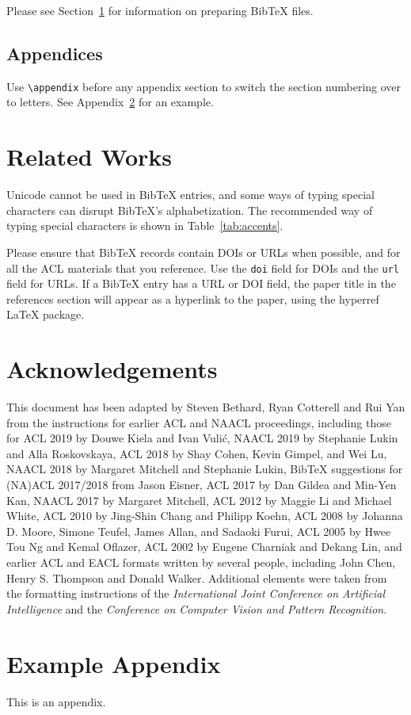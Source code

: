 \documentclass[11pt]{article}
\begin{document}
Please see Section~\ref{sec:bibtex} for information on preparing Bib\TeX{} files.

\subsection{Appendices}

Use \verb|\appendix| before any appendix section to switch the section numbering over to letters. See Appendix~\ref{sec:appendix} for an example.

\section{Related Works}
\label{sec:bibtex}

Unicode cannot be used in Bib\TeX{} entries, and some ways of typing special characters can disrupt Bib\TeX's alphabetization. The recommended way of typing special characters is shown in Table~\ref{tab:accents}.

Please ensure that Bib\TeX{} records contain DOIs or URLs when possible, and for all the ACL materials that you reference.
Use the \verb|doi| field for DOIs and the \verb|url| field for URLs.
If a Bib\TeX{} entry has a URL or DOI field, the paper title in the references section will appear as a hyperlink to the paper, using the hyperref \LaTeX{} package.

\section*{Acknowledgements}

This document has been adapted
by Steven Bethard, Ryan Cotterell and Rui Yan
from the instructions for earlier ACL and NAACL proceedings, including those for 
ACL 2019 by Douwe Kiela and Ivan Vuli\'{c},
NAACL 2019 by Stephanie Lukin and Alla Roskovskaya, 
ACL 2018 by Shay Cohen, Kevin Gimpel, and Wei Lu, 
NAACL 2018 by Margaret Mitchell and Stephanie Lukin,
Bib\TeX{} suggestions for (NA)ACL 2017/2018 from Jason Eisner,
ACL 2017 by Dan Gildea and Min-Yen Kan, 
NAACL 2017 by Margaret Mitchell, 
ACL 2012 by Maggie Li and Michael White, 
ACL 2010 by Jing-Shin Chang and Philipp Koehn, 
ACL 2008 by Johanna D. Moore, Simone Teufel, James Allan, and Sadaoki Furui, 
ACL 2005 by Hwee Tou Ng and Kemal Oflazer, 
ACL 2002 by Eugene Charniak and Dekang Lin, 
and earlier ACL and EACL formats written by several people, including
John Chen, Henry S. Thompson and Donald Walker.
Additional elements were taken from the formatting instructions of the \emph{International Joint Conference on Artificial Intelligence} and the \emph{Conference on Computer Vision and Pattern Recognition}.

%


\appendix

\section{Example Appendix}
\label{sec:appendix}

This is an appendix.
\end{document}
